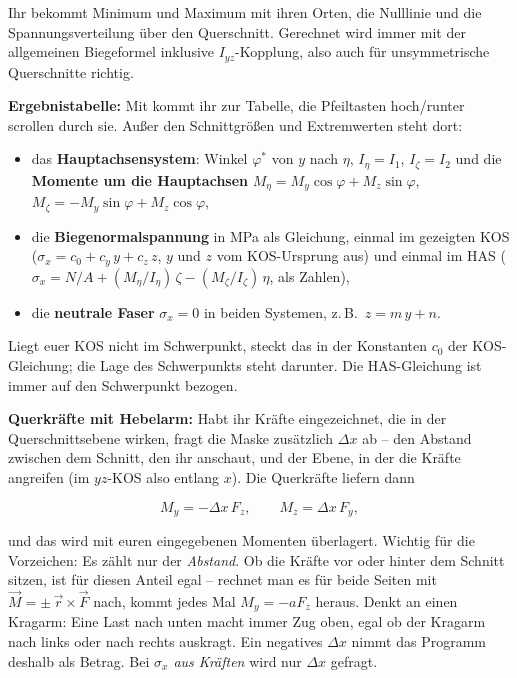Ihr bekommt Minimum und Maximum mit ihren Orten, die Nulllinie und die Spannungsverteilung über
den Querschnitt. Gerechnet wird immer mit der allgemeinen Biegeformel inklusive
$I_{yz}$-Kopplung, also auch für unsymmetrische Querschnitte richtig.

\textbf{Ergebnistabelle:} Mit  kommt ihr zur Tabelle, die Pfeiltasten hoch/runter
scrollen durch sie. Außer den Schnittgrößen und
Extremwerten steht dort:

\begin{itemize}
  \item das \textbf{Hauptachsensystem}: Winkel $\varphi^*$ von $y$ nach $\eta$, $I_\eta = I_1$,
        $I_\zeta = I_2$ und die \textbf{Momente um die Hauptachsen}
        $M_\eta = M_y\cos\varphi + M_z\sin\varphi$, $M_\zeta = -M_y\sin\varphi + M_z\cos\varphi$,
  \item die \textbf{Biegenormalspannung} in MPa als Gleichung, einmal im gezeigten KOS
        ($\sigma_x = c_0 + c_y\,y + c_z\,z$, $y$ und $z$ vom KOS-Ursprung aus) und einmal im HAS
        ($\sigma_x = N/A + (M_\eta/I_\eta)\,\zeta - (M_\zeta/I_\zeta)\,\eta$, als Zahlen),
  \item die \textbf{neutrale Faser} $\sigma_x = 0$ in beiden Systemen, z.\,B.\ $z = m\,y + n$.
\end{itemize}

Liegt euer KOS nicht im Schwerpunkt, steckt das in der Konstanten $c_0$ der KOS-Gleichung; die
Lage des Schwerpunkts steht darunter. Die HAS-Gleichung ist immer auf den Schwerpunkt bezogen.

\textbf{Querkräfte mit Hebelarm:} Habt ihr Kräfte eingezeichnet, die in der Querschnittsebene
wirken, fragt die Maske zusätzlich $\Delta x$ ab -- den Abstand zwischen dem Schnitt, den ihr
anschaut, und der Ebene, in der die Kräfte angreifen (im $yz$-KOS also entlang $x$). Die
Querkräfte liefern dann

\[
  M_y = -\Delta x\,F_z, \qquad M_z = \Delta x\,F_y ,
\]

und das wird mit euren eingegebenen Momenten überlagert. Wichtig für die Vorzeichen: Es zählt
nur der \emph{Abstand}. Ob die Kräfte vor oder hinter dem Schnitt sitzen, ist für diesen Anteil
egal -- rechnet man es für beide Seiten mit $\vec M = \pm\,\vec r \times \vec F$ nach, kommt
jedes Mal $M_y = -a F_z$ heraus. Denkt an einen Kragarm: Eine Last nach unten macht immer Zug
oben, egal ob der Kragarm nach links oder nach rechts auskragt. Ein negatives $\Delta x$ nimmt
das Programm deshalb als Betrag. Bei \emph{$\sigma_x$ aus Kräften} wird nur $\Delta x$ gefragt.

